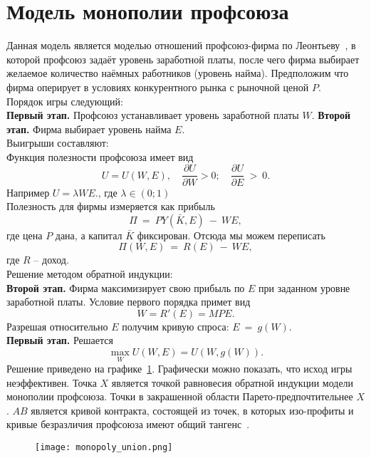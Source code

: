 \section{Модель монополии профсоюза}
\label{sec:monopoly}

Данная модель является моделью отношений профсоюз-фирма по Леонтьеву~\cite{LeontiefW}, в которой профсоюз задаёт уровень заработной платы, после чего фирма выбирает желаемое количество наёмных работников (уровень найма). Предположим что фирма оперирует в условиях конкурентного рынка с рыночной ценой $P$.\\

Порядок игры следующий:\\
\textbf{Первый этап.} Профсоюз устанавливает уровень заработной платы $W$.
\textbf{Второй этап.} Фирма выбирает уровень найма $E$.\\

Выигрыши составляют:\\
Функция полезности профсоюза имеет вид 
$$ U = U(W,E), \quad \frac{\partial U}{\partial W} > 0; \quad \frac{\partial U}{\partial E}~>~0.$$ 
Например $U = \lambda WE.$, где $\lambda \in (0; 1)$\\
Полезность для фирмы измеряется как прибыль 
$$\Pi~=~PY(\bar K,E)~-~WE,$$ 
где цена $P$ дана, а капитал $\bar K$ фиксирован. Отсюда мы можем переписать 
$$\Pi(W,E)~=~R(E)~-~WE,$$ 
где $R$ -- доход.\\

Решение методом обратной индукции:\\
\textbf{Второй этап.} Фирма максимизирует свою прибыль по $E$ при заданном уровне заработной платы. Условие первого порядка примет вид
$$ W = R'(E) = MPE. $$
Разрешая относительно $E$ получим кривую спроса: $E~=~g(W)$.\\
\textbf{Первый этап.} Решается
$$ \max_W U(W,E) = U(W,g(W)). $$
Решение приведено на графике~\ref{fig:monopoly_union}. Графически можно показать, что исход игры неэффективен. Точка $X$ является точкой равновесия обратной индукции модели монополии профсоюза. Точки в закрашенной области Парето-предпочтительнее $X$. $AB$ является кривой контракта, состоящей из точек, в которых изо-профиты и кривые безразличия профсоюза имеют общий тангенс~\cite{ShandongUniver}.


\begin{figure}[h]
		\texttt{[image: monopoly\_union.png]}
		\caption{}
		\label{fig:monopoly_union}
\end{figure}

